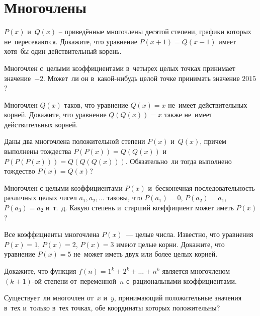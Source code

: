 
\section*{Многочлены}


\begin{problems}

\item
$P(x)$ и~$Q(x)$ -- приведённые многочлены десятой степени, графики которых
не~пересекаются.
Докажите, что уравнение $P(x + 1) = Q(x - 1)$ имеет хотя~бы один действительный
корень.

\item
Многочлен с~целыми коэффициентами в~четырех целых точках принимает
значение~$-2$.
Может~ли он в~какой-нибудь целой точке принимать значение $2015$?

\item
Многочлен $Q(x)$ таков, что уравнение $Q(x) = x$ не~имеет действительных
корней.
Докажите, что уравнение $Q(Q(x)) = x$ также не~имеет действительных корней.

\item
Даны два многочлена положительной степени $P(x)$ и~$Q(x)$, причем выполнены
тождества $P(P(x)) = Q(Q(x))$ и~$P(P(P(x))) = Q(Q(Q(x)))$.
Обязательно~ли тогда выполнено тождество $P(x) = Q(x)$?

\item
Многочлен с целыми коэффициентами $P(x)$ и~бесконечная последовательность
различных целых чисел $a_1, a_2, \ldots$ таковы, что
$P(a_1) = 0$, $P(a_2) = a_1$, $P(a_3) = a_2$ и~т.~д.
Какую степень и~старший коэффициент может иметь $P(x)$?

\item
Все коэффициенты многочлена $P(x)$~--- целые числа.
Известно, что уравнения $P(x) = 1$, $P(x) = 2$, $P(x) = 3$ имеют целые корни.
Докажите, что уравнение $P(x) = 5$ не~может иметь двух или более целых корней.

\item
Докажите, что функция $f(n) = 1^k + 2^k + \ldots + n^k$ является многочленом
$(k + 1)$-ой степени от~переменной~$n$ с~рациональными коэффициентами.

\item
Существует~ли многочлен от~$x$ и~$y$, принимающий положительные значения в~тех
и~только в~тех точках, обе координаты которых положительны?


\end{problems}
